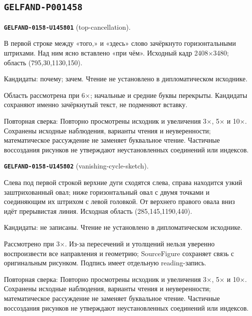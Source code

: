 \subsection*{\texttt{GELFAND-P001458}}
\par\noindent\leavevmode{}\label{GELFAND-0158-U145801}\label{GELFAND-P001458:top-cancellation}\textbf{\texttt{GELFAND-0158-U145801}} (top-cancellation).\nopagebreak[4]\par
В первой строке между «того,» и «здесь» слово зачёркнуто горизонтальными штрихами. Над ним ясно вставлено «при чём». Исходный кадр 2408×3480; область (795,30,1130,150).\par
Кандидаты: почему; зачем. Чтение не установлено в дипломатическом исходнике.\par
Область рассмотрена при 6×; начальные и средние буквы перекрыты. Кандидаты сохраняют именно зачёркнутый текст, не подменяют вставку.\par
Повторная сверка: Повторно просмотрены исходник и увеличения 3×, 5× и 10×. Сохранены исходные наблюдения, варианты чтения и неуверенности; математическое рассуждение не заменяет буквальное чтение. Частичные воссоздания рисунков не утверждают неустановленных соединений или индексов.\par\medskip
\par\noindent\leavevmode{}\label{GELFAND-0158-U145802}\label{GELFAND-P001458:vanishing-cycle-sketch}\textbf{\texttt{GELFAND-0158-U145802}} (vanishing-cycle-sketch).\nopagebreak[4]\par
Слева под первой строкой верхние дуги сходятся слева, справа находится узкий заштрихованный овал; ниже горизонтальный овал с двумя точками и соединяющим их штрихом с левой головкой. От верхнего правого овала вниз идёт прерывистая линия. Исходная область (285,145,1190,440).\par
Кандидаты: не записаны. Чтение не установлено в дипломатическом исходнике.\par
Рассмотрено при 3×. Из-за пересечений и утолщений нельзя уверенно воспроизвести все направления и геометрию; SourceFigure сохраняет связь с оригинальным рисунком. Подпись имеет отдельную reading-запись.\par
Повторная сверка: Повторно просмотрены исходник и увеличения 3×, 5× и 10×. Сохранены исходные наблюдения, варианты чтения и неуверенности; математическое рассуждение не заменяет буквальное чтение. Частичные воссоздания рисунков не утверждают неустановленных соединений или индексов.\par\medskip
